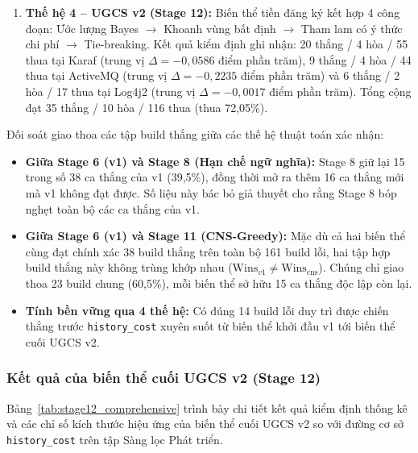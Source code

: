 \begin{enumerate}
    \item \textbf{Thế hệ 4 -- UGCS v2 (Stage 12):} Biến thể tiền đăng ký kết hợp 4 công đoạn: Ước lượng Bayes $\to$ Khoanh vùng bất định $\to$ Tham lam có ý thức chi phí $\to$ Tie-breaking.
    Kết quả kiểm định ghi nhận: 20 thắng / 4 hòa / 55 thua tại Karaf (trung vị $\Delta = -0,0586$ điểm phần trăm), 9 thắng / 4 hòa / 44 thua tại ActiveMQ (trung vị $\Delta = -0,2235$ điểm phần trăm) và 6 thắng / 2 hòa / 17 thua tại Log4j2 (trung vị $\Delta = -0,0017$ điểm phần trăm). Tổng cộng đạt 35 thắng / 10 hòa / 116 thua (thua 72,05\%).
\end{enumerate}

Đối soát giao thoa các tập build thắng giữa các thế hệ thuật toán xác nhận:
\begin{itemize}
    \item \textbf{Giữa Stage 6 (v1) và Stage 8 (Hạn chế ngữ nghĩa):} Stage 8 giữ lại 15 trong số 38 ca thắng của v1 (39,5\%), đồng thời mở ra thêm 16 ca thắng mới mà v1 không đạt được. Số liệu này bác bỏ giả thuyết cho rằng Stage 8 bóp nghẹt toàn bộ các ca thắng của v1.
    \item \textbf{Giữa Stage 6 (v1) và Stage 11 (CNS-Greedy):} Mặc dù cả hai biến thể cùng đạt chính xác 38 build thắng trên toàn bộ 161 build lỗi, hai tập hợp build thắng này không trùng khớp nhau ($\text{Wins}_{v1} \neq \text{Wins}_{\text{cns}}$). Chúng chỉ giao thoa 23 build chung (60,5\%), mỗi biến thể sở hữu 15 ca thắng độc lập còn lại.
    \item \textbf{Tính bền vững qua 4 thế hệ:} Có đúng 14 build lỗi duy trì được chiến thắng trước \texttt{history\_cost} xuyên suốt từ biến thể khởi đầu v1 tới biến thể cuối UGCS v2.
\end{itemize}

\subsubsection{Kết quả của biến thể cuối UGCS v2 (Stage 12)}
\label{subsubsec:stage12_results}

Bảng~\ref{tab:stage12_comprehensive} trình bày chi tiết kết quả kiểm định thống kê và các chỉ số kích thước hiệu ứng của biến thể cuối UGCS v2 so với đường cơ sở \texttt{history\_cost} trên tập Sàng lọc Phát triển.


